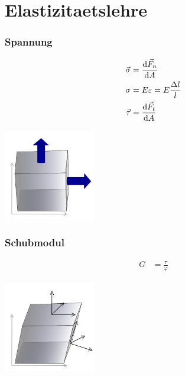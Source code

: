\newpage
\section{Elastizitaetslehre}

\begin{multicols}{2}{}
\subsubsection*{Spannung}
\begin{align*}
\vec{\sigma}&=\frac{\mathop{}\!\mathrm{d}\vec{F}_n}{\mathop{}\!\mathrm{d} A}\\
\sigma&=E \varepsilon=E\frac{\Delta l}{l}\\
\vec{\tau}&= \frac{\mathop{}\!\mathrm{d}\vec{F}_t}{\mathop{}\!\mathrm{d} A}
\end{align*}
\hfill

\begin{center}
 \includegraphics[width=40mm,height=40mm,keepaspectratio=true]{./Physik/Bilder/Spannung.png}
\end{center}
\end{multicols}


\subsubsection*{Schubmodul}

\begin{multicols}{2}{}
\begin{align*}
G&=\frac{\tau}{\varphi}
\end{align*}
\hfill

\begin{center}
 \includegraphics[width=40mm,height=40mm,keepaspectratio=true]{./Physik/Bilder/Tangentialspannung.png}
\end{center}
\end{multicols}


